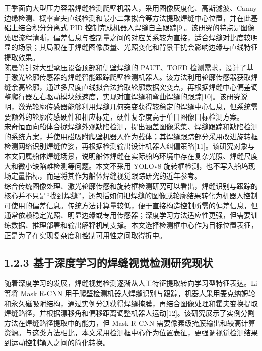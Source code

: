 \documentclass[UTF8,a4paper,12pt]{ctexrep}
\begin{document}
王季面向大型压力容器焊缝检测爬壁机器人，采用图像灰度化、高斯滤波、Canny 边缘检测、概率霍夫直线检测和最小二乘拟合等方法提取焊缝中心位置，并在此基础上结合积分分离式 PID 控制完成机器人焊缝自主跟踪[9]。该研究的特点是图像处理流程清晰，偏差信息与控制量之间的对应关系较为直接，适合焊缝对比度较明显的场景；其局限在于焊缝图像质量、光照变化和背景干扰会影响边缘与直线特征提取效果。\\

陈晨等针对大型承压设备顶部和侧壁焊缝的 PAUT、TOFD 检测需求，设计了基于激光轮廓传感器的焊缝智能跟踪爬壁检测机器人。该方法利用轮廓传感器获取焊缝余高轮廓，通过多尺度直线拟合法拾取轮廓数据突变点，再根据焊缝中心偏差调整爬行器左右驱动模块线速度，实现对直焊缝和弯曲焊缝的跟踪[10]。该研究说明，激光轮廓传感器能够利用焊缝几何突变获得较稳定的焊缝中心信息，但系统需要额外的轮廓传感硬件和相应标定，硬件复杂度高于单目图像目标检测方案。\\

宋奇恒面向船体合拢焊缝外观缺陷检测，提出涵盖图像采集、焊缝跟踪和缺陷检测的系统方案，并使用磁吸附爬壁机器人作为载体；其焊缝跟踪部分采用改进旋转框检测网络识别焊缝位姿，再根据检测输出设计机器人纠偏策略[11]。该研究对象与本文同属船体焊缝场景，说明船体焊缝在实际船坞环境中存在复杂光照、焊缝尺度大和微小缺陷难检测等问题。本文不采用 YOLOv8 旋转框检测，也不写入船坞现场定量指标，而是将其作为船体焊缝视觉跟踪研究的近年参考。\\

综合传统图像处理、激光轮廓传感和旋转框检测研究可以看出，焊缝识别与跟踪的核心并不只是“找到焊缝”，还包括如何把焊缝的图像或轮廓结果转化为机器人控制可使用的偏差信息。传统方法计算量较低，便于直接构造控制所需的偏差信息，但通常依赖稳定光照、明显边缘或专用传感器；深度学习方法适应性更强，但需要训练数据、推理部署和输出解释机制支撑。本文选择检测框中心作为目标位置表征，正是为了在实现复杂度和控制可用性之间取得折中。\\

\subsection{1.2.3 基于深度学习的焊缝视觉检测研究现状}

随着深度学习的发展，焊缝视觉检测逐渐从人工特征提取转向学习型特征表达。Li 等将 Mask R-CNN 用于爬壁检测机器人焊缝识别与跟踪，机器人采用麦克纳姆轮和永久磁吸附结构，通过实例分割获得焊缝掩膜，再结合图像处理和霍夫变换提取焊缝路径，并根据漂移角和偏移距离调整机器人运动[12]。该研究展示了实例分割方法在焊缝路径提取中的能力，但 Mask R-CNN 需要像素级掩膜输出和较高计算资源。与这类方法相比，本文采用检测框中心作为位置表征，更强调视觉检测结果到运动控制输入之间的简化转换。\\
\end{document}
